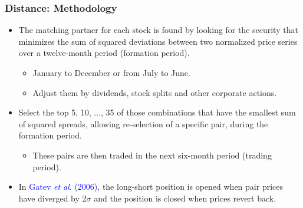 \documentclass[pdf,9pt,xcolor=dvipsnames,hide notes]{beamer}
\begin{document}
\begin{frame}[label=frame2c]
\frametitle{Distance: Methodology}


\begin{itemize}
\justifying
\item  The matching partner for each stock is found by looking for the security that minimizes the sum of squared deviations between two normalized price series over a twelve-month period (formation period).

	\begin{itemize}
	\item January to December or from July to June.
	\item Adjust them by dividends, stock splits and other corporate actions.
	\end{itemize}


%

\vspace{0.3cm}

\pause
\item Select the top 5, 10, $\ldots$, 35 of those combinations that have the smallest sum of squared spreads, allowing re-selection of a specific pair, during the formation period. 

\pause
	\begin{itemize}
		\item These pairs are then traded in the next six-month period (trading period).
	\end{itemize}

\vspace{0.3cm}

\pause 

\item In \textcolor{blue}{Gatev \emph{et al}}. \textcolor{blue}{(2006)}, the long-short position is opened when pair prices have diverged by 2$\sigma$ and the position is closed when prices revert back.


\end{itemize}

\end{frame}
\end{document}
